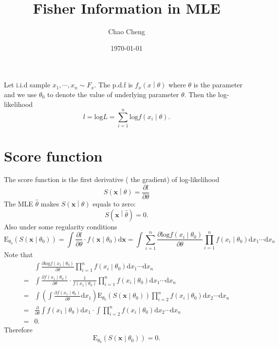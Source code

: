 \documentclass[a4paper,12pt]{article}
\title{Fisher Information in MLE}
\author{Chao Cheng}
\date{\today}
\begin{document}
\maketitle
\tableofcontents{}


Let i.i.d sample $x_1, \cdots, x_n \sim F_x$. The p.d.f is $f_x\left(x\middle|\theta\right)$ where $\theta$ is the parameter and we use $\theta_0$ to denote the value of underlying parameter $\theta$. Then the log-likelihood
\[
  l = \mathrm{log}L = \sum\limits_{i = 1}^n\mathrm{log}f\left(x_i\middle|\theta\right)
  .
\]

\section{Score function}
\label{sec:score-function}

The {\color{red} score function} is the first derivative ({\color{red} the gradient}) of log-likelihood
\begin{equation}
  \label{eq:score_function}
  S\left(\bm{x}\middle|\theta\right)
  = \frac{\partial l}{\partial \theta}
\end{equation}
The MLE $\hat{\theta}$ makes $S\left(\bm{x}\middle|\theta\right)$ equals to zero:
\[
  S\left(\bm{x}\middle|\hat{\theta}\right) = 0
  .
\]
Also under some regularity conditions
\[
  \mathrm{E}_{\theta_0}\left(
    S\left(\bm{x}\middle|\theta_0\right)
  \right)
  = \bm{\int} \frac{\partial l}{\partial\theta}
  \cdot f\left(\bm{x}\middle|\theta_0\right)
  \mathrm{d}\bm{x}
  = \bm{\int} \sum\limits_{i = 1}^n\frac{\partial\mathrm{log}f\left(x_i\middle|\theta_0\right)}{\partial \theta}
  \prod\limits_{i = 1}^nf\left(x_i\middle|\theta_0\right)
  \mathrm{d}x_1\cdots\mathrm{d}x_n
\]
Note that
\[
  \begin{aligned}
    & \bm{\int} \frac{\partial\mathrm{log}f\left(x_1\middle|\theta_0\right)}{\partial \theta}
      \prod\limits_{i = 1}^nf\left(x_i\middle|\theta_0\right)
      \mathrm{d}x_1\cdots\mathrm{d}x_n    \\
    =& \bm{\int}
       \frac{\partial f\left(x_1\middle|\theta_0\right)}{\partial \theta}
       \cdot \frac{1}{f\left(x_1\middle|\theta_0\right)}
       \prod\limits_{i = 1}^nf\left(x_i\middle|\theta_0\right)
       \mathrm{d}x_1\cdots\mathrm{d}x_n    \\
    =& \bm{\int}
       \left(
       \int \frac{\partial f\left(x_1\middle|\theta_0\right)}{\partial \theta}
       \mathrm{d}x_1
       \right)
  \mathrm{E}_{\theta_0}\left(
    S\left(\bm{x}\middle|\theta_0\right)
  \right)       \prod\limits_{i = 2}^nf\left(x_i\middle|\theta_0\right)
       \mathrm{d}x_2\cdots\mathrm{d}x_n    \\
    =& \frac{\partial}{\partial\theta}
       \int f\left(x_1\middle|\theta_0\right)\mathrm{d}x_1
       \cdot \bm{\int}
       \prod\limits_{i = 2}^nf\left(x_i\middle|\theta_0\right)
       \mathrm{d}x_2\cdots\mathrm{d}x_n    \\
    =& 0
       .
  \end{aligned}
\]
Therefore
\[
  \mathrm{E}_{\theta_0}\left(
    S\left(\bm{x}\middle|\theta_0\right)
  \right)
  = 0
  .
\]
\end{document}

